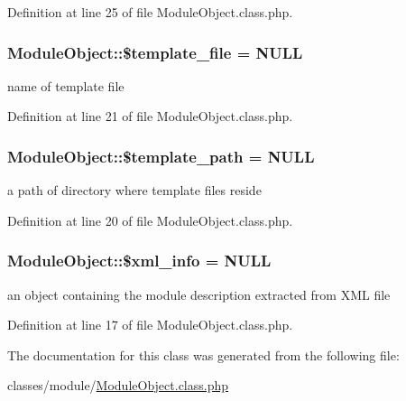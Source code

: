 Definition at line 25 of file Module\-Object.\-class.\-php.

\hypertarget{classModuleObject_a6eddf08e627527affc7e835a6d302733}{
\subsubsection[{\$template\-\_\-file}]{\setlength{\rightskip}{0pt plus 5cm}Module\-Object\-::\$template\-\_\-file = N\-U\-L\-L}}\label{classModuleObject_a6eddf08e627527affc7e835a6d302733}


name of template file 



Definition at line 21 of file Module\-Object.\-class.\-php.

\hypertarget{classModuleObject_a8a632bae853adef8e2ab9596a3a86661}{
\subsubsection[{\$template\-\_\-path}]{\setlength{\rightskip}{0pt plus 5cm}Module\-Object\-::\$template\-\_\-path = N\-U\-L\-L}}\label{classModuleObject_a8a632bae853adef8e2ab9596a3a86661}


a path of directory where template files reside 



Definition at line 20 of file Module\-Object.\-class.\-php.

\hypertarget{classModuleObject_aa0003698bcfe16bb25031435df251715}{
\subsubsection[{\$xml\-\_\-info}]{\setlength{\rightskip}{0pt plus 5cm}Module\-Object\-::\$xml\-\_\-info = N\-U\-L\-L}}\label{classModuleObject_aa0003698bcfe16bb25031435df251715}


an object containing the module description extracted from X\-M\-L file 



Definition at line 17 of file Module\-Object.\-class.\-php.



The documentation for this class was generated from the following file\-:\begin{DoxyCompactItemize}
\item 
classes/module/\hyperlink{ModuleObject_8class_8php}{Module\-Object.\-class.\-php}\end{DoxyCompactItemize}

